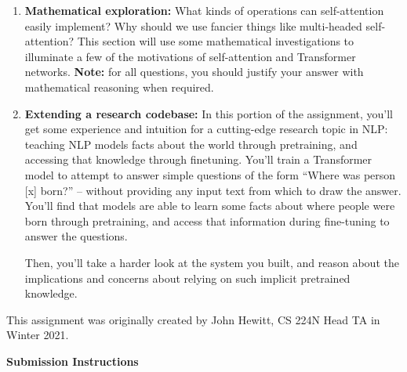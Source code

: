 \documentclass[answers]{exam}
\begin{document}
\begin{enumerate}
\item \textbf{Mathematical exploration:}  What kinds of operations can self-attention easily implement? Why should we use fancier things like multi-headed self-attention?
This section will use some mathematical investigations to illuminate a few of the motivations of self-attention and Transformer networks.
{\color{red} \textbf{Note:} for all questions, you should justify your answer with mathematical reasoning when required.}

\item \textbf{Extending a research codebase:}
In this portion of the assignment, you'll get some experience and intuition for a cutting-edge research topic in NLP: teaching NLP models facts about the world through pretraining, and accessing that knowledge through finetuning.
You'll train a Transformer model to attempt to answer simple questions of the form ``Where was person [x] born?'' -- without providing any input text from which to draw the answer.
You'll find that models are able to learn some facts about where people were born through pretraining, and access that information during fine-tuning to answer the questions.

Then, you'll take a harder look at the system you built, and reason about the implications and concerns about relying on such implicit pretrained knowledge.


\end{enumerate}

This assignment was originally created by John Hewitt, CS 224N Head TA in Winter 2021. 



\newpage

\begin{questions}
   
   
\end{questions}

\Large{\textbf{Submission Instructions}}
\end{document}
